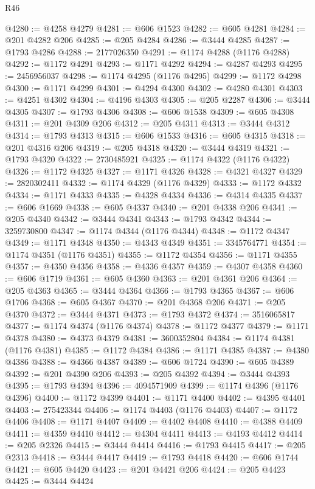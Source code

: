 \begin{lexlean}{R46}
\begin{coremodule}
@4280 := @4258 @4279
@4281 := @606 @1523
@4282 := @605 @4281
@4284 := @201 @4282 @206
@4285 := @205 @4284
@4286 := @3444 @4285
@4287 := @1793 @4286
@4288 := 2177026350
@4291 := @1174 @4288 (@1176 @4288)
@4292 := @1172 @4291
@4293 := @1171 @4292
@4294 := @4287 @4293
@4295 := 2456956037
@4298 := @1174 @4295 (@1176 @4295)
@4299 := @1172 @4298
@4300 := @1171 @4299
@4301 := @4294 @4300
@4302 := @4280 @4301
@4303 := @4251 @4302
@4304 := @4196 @4303
@4305 := @205 @2287
@4306 := @3444 @4305
@4307 := @1793 @4306
@4308 := @606 @1538
@4309 := @605 @4308
@4311 := @201 @4309 @206
@4312 := @205 @4311
@4313 := @3444 @4312
@4314 := @1793 @4313
@4315 := @606 @1533
@4316 := @605 @4315
@4318 := @201 @4316 @206
@4319 := @205 @4318
@4320 := @3444 @4319
@4321 := @1793 @4320
@4322 := 2730485921
@4325 := @1174 @4322 (@1176 @4322)
@4326 := @1172 @4325
@4327 := @1171 @4326
@4328 := @4321 @4327
@4329 := 2820302411
@4332 := @1174 @4329 (@1176 @4329)
@4333 := @1172 @4332
@4334 := @1171 @4333
@4335 := @4328 @4334
@4336 := @4314 @4335
@4337 := @606 @1669
@4338 := @605 @4337
@4340 := @201 @4338 @206
@4341 := @205 @4340
@4342 := @3444 @4341
@4343 := @1793 @4342
@4344 := 3259730800
@4347 := @1174 @4344 (@1176 @4344)
@4348 := @1172 @4347
@4349 := @1171 @4348
@4350 := @4343 @4349
@4351 := 3345764771
@4354 := @1174 @4351 (@1176 @4351)
@4355 := @1172 @4354
@4356 := @1171 @4355
@4357 := @4350 @4356
@4358 := @4336 @4357
@4359 := @4307 @4358
@4360 := @606 @1719
@4361 := @605 @4360
@4363 := @201 @4361 @206
@4364 := @205 @4363
@4365 := @3444 @4364
@4366 := @1793 @4365
@4367 := @606 @1706
@4368 := @605 @4367
@4370 := @201 @4368 @206
@4371 := @205 @4370
@4372 := @3444 @4371
@4373 := @1793 @4372
@4374 := 3516065817
@4377 := @1174 @4374 (@1176 @4374)
@4378 := @1172 @4377
@4379 := @1171 @4378
@4380 := @4373 @4379
@4381 := 3600352804
@4384 := @1174 @4381 (@1176 @4381)
@4385 := @1172 @4384
@4386 := @1171 @4385
@4387 := @4380 @4386
@4388 := @4366 @4387
@4389 := @606 @1724
@4390 := @605 @4389
@4392 := @201 @4390 @206
@4393 := @205 @4392
@4394 := @3444 @4393
@4395 := @1793 @4394
@4396 := 4094571909
@4399 := @1174 @4396 (@1176 @4396)
@4400 := @1172 @4399
@4401 := @1171 @4400
@4402 := @4395 @4401
@4403 := 275423344
@4406 := @1174 @4403 (@1176 @4403)
@4407 := @1172 @4406
@4408 := @1171 @4407
@4409 := @4402 @4408
@4410 := @4388 @4409
@4411 := @4359 @4410
@4412 := @4304 @4411
@4413 := @4193 @4412
@4414 := @205 @2326
@4415 := @3444 @4414
@4416 := @1793 @4415
@4417 := @205 @2313
@4418 := @3444 @4417
@4419 := @1793 @4418
@4420 := @606 @1744
@4421 := @605 @4420
@4423 := @201 @4421 @206
@4424 := @205 @4423
@4425 := @3444 @4424

\end{coremodule}
\end{lexlean}
